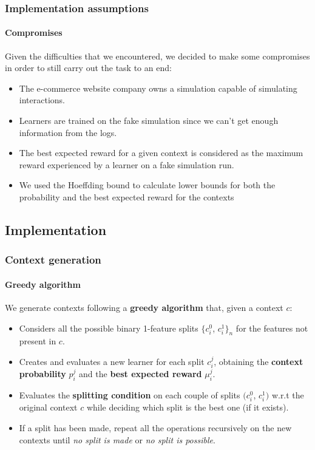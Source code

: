 
\begin{frame}

\frametitle{Implementation assumptions}
\framesubtitle{Compromises}

Given the difficulties that we encountered, we decided to make some compromises in order to still carry out the task to an end:

\begin{itemize}[label={-}]
    \item The e-commerce website company owns a simulation capable of simulating interactions.
    \item Learners are trained on the fake simulation since we can't get enough information from the logs.
    \item The best expected reward for a given context is considered as the maximum reward experienced by a learner on a fake simulation run.
    \item We used the Hoeffding bound to calculate lower bounds for both the probability and the best expected reward for the contexts
\end{itemize}

\end{frame}


\subsection{Implementation}


\begin{frame}

\frametitle{Context generation}
\framesubtitle{Greedy algorithm}

We generate contexts following a \textbf{greedy algorithm} that, given a context $c$:

\begin{itemize}[label={*}]
    \item Considers all the possible binary 1-feature splits $\{c_i^0$, $c_i^1\}_n$ for the features not present in $c$.
    \item Creates and evaluates a new learner for each split $c_i^j$, obtaining the \textbf{context probability} $p_i^j$ and the \textbf{best expected reward} $\mu_i^j$.
    \item Evaluates the \textbf{splitting condition} on each couple of splits $(c_i^0$, $c_i^1)$ w.r.t the original context $c$ while deciding which split is the best one (if it exists).
    \item If a split has been made, repeat all the operations recursively on the new contexts until \textit{no split is made} or \textit{no split is possible}.
\end{itemize}

\end{frame}

